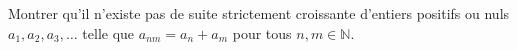 Montrer qu'il n'existe pas de suite strictement croissante d'entiers positifs ou nuls $a_1, a_2, a_3, \ldots$ telle que $a_{nm} = a_n + a_m$ pour tous $n, m \in \mathbb{N}$.
